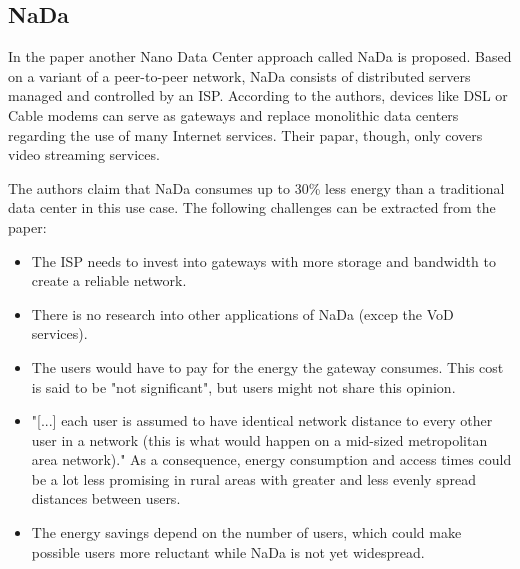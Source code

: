 \subsection{NaDa}
In the paper \cite{DBLP:conf/conext/ValanciusLMDR09} another Nano Data Center approach called NaDa is proposed. Based on a variant of a peer-to-peer network, NaDa consists of distributed servers managed and controlled by an ISP. According to the authors, devices like DSL or Cable modems can serve as gateways and replace monolithic data centers regarding the use of many Internet services. Their papar, though, only covers video streaming services. 

The authors claim that NaDa consumes up to 30\% less energy than a traditional data center in this use case. The following challenges can be extracted from the paper:

\begin{itemize}
	\item The ISP needs to invest into gateways with more storage and bandwidth to create a reliable network.
	\item There is no research into other applications of NaDa (excep the VoD services).
	\item The users would have to pay for the energy the gateway consumes. This cost is said to be "not significant", but users might not share this opinion.
	\item "[...] each user is assumed to have identical network distance to every other user in a network (this is what would happen on a mid-sized metropolitan area network)." As a consequence, energy consumption and access times could be a lot less promising in rural areas with greater and less evenly spread distances between users. 
	\item The energy savings depend on the number of users, which could make possible users more reluctant while NaDa is not yet widespread.
\end{itemize}